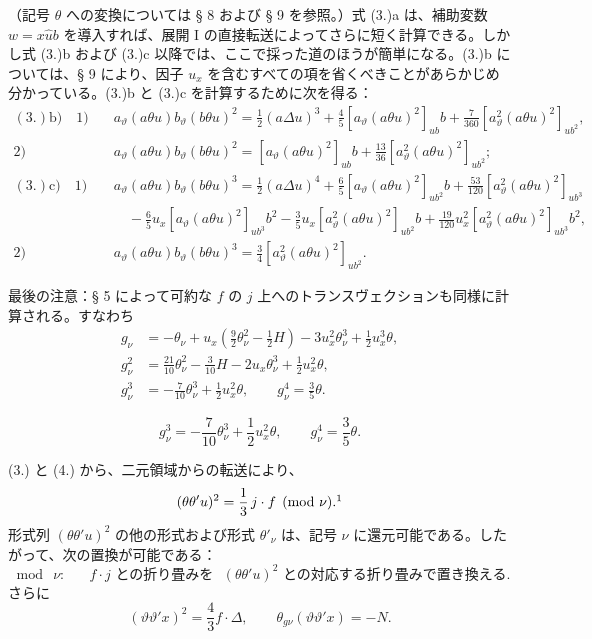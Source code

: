 \documentclass[11pt]{jlreq}
\newcommand{\A}{\Delta}
\begin{document}
（記号 $\theta$ への変換については § 8 および § 9 を参照。）式 (3.)a は、補助変数 $w=x\widehat{u}b$ を導入すれば、展開 I の直接転送によってさらに短く計算できる。しかし式 (3.)b および (3.)c 以降では、ここで採った道のほうが簡単になる。(3.)b については、§ 9 により、因子 $u_x$ を含むすべての項を省くべきことがあらかじめ分かっている。(3.)b と (3.)c を計算するために次を得る：
\[
\begin{aligned}
(3.)\mathrm{b)}\quad 1)&\quad a_\vartheta(a\theta u)b_\vartheta(b\theta u)^2=\frac12(a\Delta u)^3+\frac45[a_\vartheta(a\theta u)^2]_{ub}b+\frac7{360}[a_\vartheta^2(a\theta u)^2]_{ub^2},\\
2)&\quad a_\vartheta(a\theta u)b_\vartheta(b\theta u)^2=[a_\vartheta(a\theta u)^2]_{ub}b+\frac{13}{36}[a_\vartheta^2(a\theta u)^2]_{ub^2};\\[.5em]
(3.)\mathrm{c)}\quad 1)&\quad a_\vartheta(a\theta u)b_\vartheta(b\theta u)^3=\frac12(a\Delta u)^4+\frac65[a_\vartheta(a\theta u)^2]_{ub^2}b+\frac{53}{120}[a_\vartheta^2(a\theta u)^2]_{ub^3}\\
&\qquad-\frac65u_x[a_\vartheta(a\theta u)^2]_{ub^3}b^2-\frac35u_x[a_\vartheta^2(a\theta u)^2]_{ub^2}b+\frac{19}{120}u_x^2[a_\vartheta^2(a\theta u)^2]_{ub^3}b^2,\\
2)&\quad a_\vartheta(a\theta u)b_\vartheta(b\theta u)^3=\frac34[a_\vartheta^2(a\theta u)^2]_{ub^2}.
\end{aligned}
\]

最後の注意：§ 5 によって可約な $f$ の $j$ 上へのトランスヴェクションも同様に計算される。すなわち
\[
\tag{4}
\begin{aligned}
g_\nu&=-\theta_\nu+u_x\left(\frac92\theta_\nu^2-\frac12H\right)-3u_x^2\theta_\nu^3+\frac12u_x^3\theta,\\
g_\nu^2&=\frac{21}{10}\theta_\nu^2-\frac3{10}H-2u_x\theta_\nu^3+\frac12u_x^2\theta,\\
g_\nu^3&=-\frac7{10}\theta_\nu^3+\frac12u_x^2\theta,\qquad g_\nu^4=\frac35\theta.
\end{aligned}
\]

\[
\tag{4}
g_\nu^3=-\frac7{10}\theta_\nu^3+\frac12u_x^2\theta,
\qquad
g_\nu^4=\frac35\theta.
\]

(3.) と (4.) から、二元領域からの転送により、
\[
(\theta\theta'u)^2=\frac13\,j\cdot f\pmod{\nu}.\footnotemark
\]
形式列 $(\theta\theta'u)^2$ の他の形式および形式 $\theta'_\nu$ は、記号 $\nu$ に還元可能である。したがって、次の置換が可能である：
\[
\bmod\ \nu:\quad \text{ } f\cdot j\text{ との折り畳みを}
\text{ }(\theta\theta'u)^2\text{ との対応する折り畳みで置き換える}.
\]
さらに
\[
(\vartheta\vartheta'x)^2=\frac43 f\cdot\A,
\qquad
\theta_{g\nu}(\vartheta\vartheta'x)=-N.
\]
\end{document}
